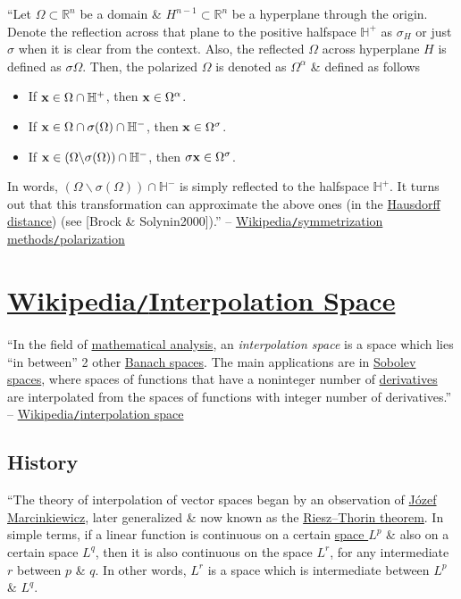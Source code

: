 \documentclass[oneside]{book}
\numberwithin{equation}{section}
\begin{document}
``Let $\Omega\subset\mathbb{R}^n$ be a domain \& $H^{n-1}\subset\mathbb{R}^n$ be a hyperplane through the origin. Denote the reflection across that plane to the positive halfspace $\mathbb{H}^+$ as $\sigma_H$ or just $\sigma$ when it is clear from the context. Also, the reflected $\Omega$ across hyperplane $H$ is defined as $\sigma\Omega$. Then, the polarized $\Omega$ is denoted as $\Omega^\alpha$ \& defined as follows
\begin{itemize}
	\item If ${\bf x}\in\Omega\cap\mathbb{H}^+$, then ${\bf x}\in\Omega^\alpha$.
	\item If ${\bf x}\in\Omega\cap\sigma(\Omega)\cap\mathbb{H}^-$, then ${\bf x}\in\Omega^\sigma$.
	\item If ${\bf x}\in(\Omega\backslash\sigma(\Omega))\cap\mathbb{H}^-$, then $\sigma{\bf x}\in\Omega^\sigma$.
\end{itemize}
In words, $(\Omega\backslash\sigma(\Omega))\cap\mathbb{H}^-$ is simply reflected to the halfspace $\mathbb{H}^+$. It turns out that this transformation can approximate the above ones (in the \href{https://en.wikipedia.org/wiki/Hausdorff_distance}{Hausdorff distance}) (see [Brock \& Solynin2000]).'' -- \href{https://en.wikipedia.org/wiki/Symmetrization_methods#Polarization}{Wikipedia\texttt{/}symmetrization methods\texttt{/}polarization}


\section{\href{https://en.wikipedia.org/wiki/Interpolation_space}{Wikipedia\texttt{/}Interpolation Space}}
``In the field of \href{https://en.wikipedia.org/wiki/Mathematical_analysis}{mathematical analysis}, an \textit{interpolation space} is a space which lies ``in between'' 2 other \href{https://en.wikipedia.org/wiki/Banach_space}{Banach spaces}. The main applications are in \href{https://en.wikipedia.org/wiki/Sobolev_space}{Sobolev spaces}, where spaces of functions that have a noninteger number of \href{https://en.wikipedia.org/wiki/Derivative}{derivatives} are interpolated from the spaces of functions with integer number of derivatives.'' -- \href{https://en.wikipedia.org/wiki/Interpolation_space}{Wikipedia\texttt{/}interpolation space}

\subsection{History}
``The theory of interpolation of vector spaces began by an observation of \href{https://en.wikipedia.org/wiki/J%C3%B3zef_Marcinkiewicz}{J\'ozef Marcinkiewicz}, later generalized \& now known as the \href{https://en.wikipedia.org/wiki/Riesz-Thorin_theorem}{Riesz--Thorin theorem}. In simple terms, if a linear function is continuous on a certain \href{https://en.wikipedia.org/wiki/Lp_space}{space $L^p$} \& also on a certain space $L^q$, then it is also continuous on the space $L^r$, for any intermediate $r$ between $p$ \& $q$. In other words, $L^r$ is a space which is intermediate between $L^p$ \& $L^q$.
\end{document}
